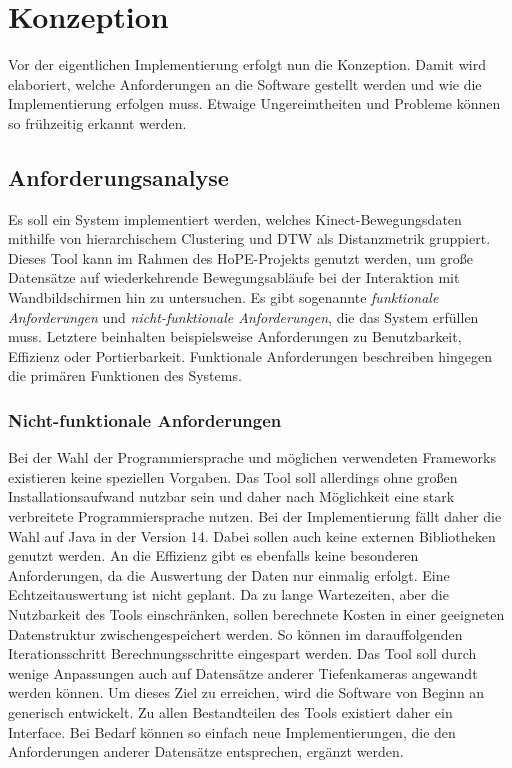 \chapter{Konzeption}
\label{chapter4}
Vor der eigentlichen Implementierung erfolgt nun die Konzeption.
Damit wird elaboriert, welche Anforderungen an die Software gestellt werden
und wie die Implementierung erfolgen muss.
Etwaige Ungereimtheiten und Probleme können so frühzeitig erkannt werden.

\section{Anforderungsanalyse}
\label{4-Anforderungsanalyse}
Es soll ein System implementiert werden,
welches Kinect-Bewegungsdaten mithilfe von hierarchischem Clustering
und \ac{DTW} als Distanzmetrik gruppiert.
Dieses Tool kann im Rahmen des HoPE-Projekts genutzt werden,
um große Datensätze auf wiederkehrende Bewegungsabläufe bei der Interaktion mit Wandbildschirmen
hin zu untersuchen.
Es gibt sogenannte \emph{funktionale Anforderungen} und \emph{nicht-funktionale Anforderungen},
die das System erfüllen muss.
Letztere beinhalten beispielsweise Anforderungen zu Benutzbarkeit, Effizienz oder Portierbarkeit.
Funktionale Anforderungen beschreiben hingegen die primären Funktionen des Systems.

\subsection{Nicht-funktionale Anforderungen}
\label{4-NichtFunktionaleAnforderungen}
Bei der Wahl der Programmiersprache und möglichen verwendeten Frameworks
existieren keine speziellen Vorgaben.
Das Tool soll allerdings ohne großen Installationsaufwand nutzbar sein
und daher nach Möglichkeit eine stark verbreitete Programmiersprache nutzen.
Bei der Implementierung fällt daher die Wahl auf Java in der Version 14.
Dabei sollen auch keine externen Bibliotheken genutzt werden.
An die Effizienz gibt es ebenfalls keine besonderen Anforderungen,
da die Auswertung der Daten nur einmalig erfolgt.
Eine Echtzeitauswertung ist nicht geplant.
Da zu lange Wartezeiten, aber die Nutzbarkeit des Tools einschränken,
sollen berechnete Kosten in einer geeigneten Datenstruktur zwischengespeichert werden.
So können im darauffolgenden Iterationsschritt Berechnungsschritte eingespart werden.
Das Tool soll durch wenige Anpassungen auch auf Datensätze anderer Tiefenkameras angewandt werden können.
Um dieses Ziel zu erreichen, wird die Software von Beginn an generisch entwickelt.
Zu allen Bestandteilen des Tools existiert daher ein Interface.
Bei Bedarf können so einfach neue Implementierungen,
die den Anforderungen anderer Datensätze entsprechen, ergänzt werden.

